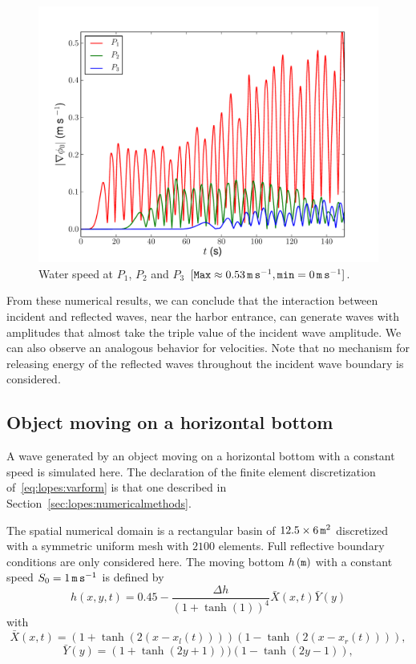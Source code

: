 \begin{figure}
  \centering
  \includegraphics[width=\largefig]{chapters/lopes/pdf/velprofile.pdf}
  \caption{Water speed at $P_1$, $P_2$ and $P_3$ $[{\tt Max}\approx
    0.53\, {\tt m\, s}^{-1}, {\tt min}=0\,{\tt m\, s}^{-1}]$.}
  \label{fig:lopes:velp}
\end{figure}

From these numerical results, we can conclude that the interaction
between incident and reflected waves, near the harbor entrance, can
generate waves with amplitudes that almost take the triple value of
the incident wave amplitude.  We can also observe an analogous
behavior for velocities.  Note that no mechanism for releasing energy
of the reflected waves throughout the incident wave boundary is
considered.

\enlargethispage{10pt}

\subsection{Object moving on a horizontal bottom}

A wave generated by an object moving on a horizontal bottom with a
constant speed is simulated here.  The declaration of the finite
element discretization of~\eqref{eq:lopes:varform} is that one
described in Section~\ref{sec:lopes:numericalmethods}.

The spatial numerical domain is a rectangular basin of $12.5\times 6\,
{\tt m}^2$ discretized with a symmetric uniform mesh with $2100$
elements.  Full reflective boundary conditions are only considered
here.  The moving bottom $h\, ({\tt m})$ with a constant speed
$S_0=1\, {\tt m\, s}^{-1}$ is defined by
\begin{equation}
  \label{eq:lopes:bottom1}
  h(x,y,t)=0.45-\frac{\Delta h}{(1+\tanh(1))^4}{\bar
    X}(x,t){\bar Y}(y)
\end{equation}
with
\begin{equation}
  {\bar X}(x,t)=(1+\tanh(2(x-x_l(t))))(1-\tanh(2(x-x_r(t)))),
\end{equation}
\begin{equation}
  {\bar Y}(y)=(1+\tanh(2y+1)))(1-\tanh(2y-1)),
\end{equation}

